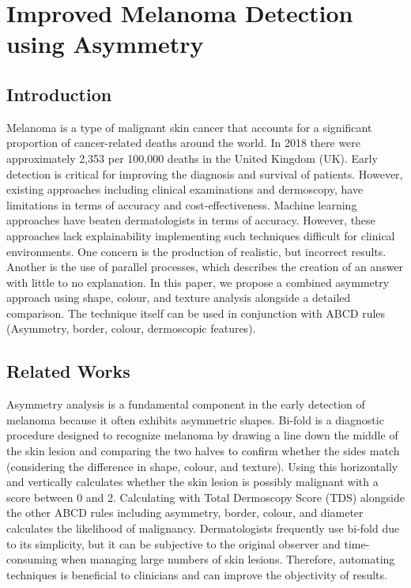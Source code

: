 \chapter{Improved Melanoma Detection using Asymmetry}

\section{Introduction}

Melanoma is a type of malignant skin cancer that accounts for a significant proportion of cancer-related deaths around the world. In 2018 there were approximately 2,353 per 100,000 deaths in the United Kingdom (UK)\cite{UK2019}. Early detection is critical for improving the diagnosis and survival of patients. However, existing approaches including clinical examinations and dermoscopy, have limitations in terms of accuracy and cost-effectiveness\cite{Takiddin2021}. Machine learning approaches have beaten dermatologists in terms of accuracy\cite{Andre2017}. However, these approaches lack explainability implementing such techniques difficult for clinical environments\cite{Jiang2017}. One concern is the production of realistic, but incorrect results\cite{Ghorbani2019}. Another is the use of parallel processes, which describes the creation of an answer with little to no explanation. In this paper, we propose a combined asymmetry approach using shape, colour, and texture analysis alongside a detailed comparison. The technique itself can be used in conjunction with ABCD rules (Asymmetry, border, colour, dermoscopic features).



\section{Related Works}

Asymmetry analysis is a fundamental component in the early detection of melanoma because it often exhibits asymmetric shapes\cite{}. Bi-fold is a diagnostic procedure designed to recognize melanoma by drawing a line down the middle of the skin lesion and comparing the two halves to confirm whether the sides match (considering the difference in shape, colour, and texture). Using this horizontally and vertically calculates whether the skin lesion is possibly malignant with a score between 0 and 2. Calculating with Total Dermoscopy Score (TDS) alongside the other ABCD rules including asymmetry, border, colour, and diameter calculates the likelihood of malignancy. Dermatologists frequently use bi-fold due to its simplicity, but it can be subjective to the original observer and time-consuming when managing large numbers of skin lesions. Therefore, automating techniques is beneficial to clinicians and can improve the objectivity of results.

